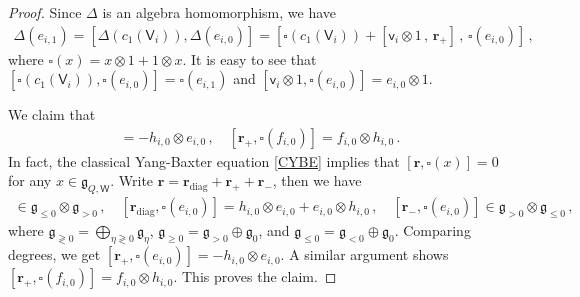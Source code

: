 \documentclass[10pt]{amsart}
\theoremstyle{definition}
\numberwithin{equation}{section}
\newcommand{\sW}{\mathsf{W}}
\begin{document}
\begin{proof}
Since $\Delta$ is an algebra homomorphism, we have
\begin{align*}
\Delta(e_{i,1})=[\Delta(c_1(\mathsf V_i)),\Delta(e_{i,0})]=\left[\square(c_1(\mathsf V_i)) +\left[\mathsf v_i\otimes 1\,,\,\pmb r_+\right]\,,\, \square(e_{i,0})\right]\,,
\end{align*}
where $\square(x)=x\otimes 1+1\otimes x$. It is easy to see that $[\square(c_1(\mathsf V_i)),\square(e_{i,0})]=\square(e_{i,1})$ and $[\mathsf v_i\otimes 1,\square(e_{i,0})]=e_{i,0}\otimes 1$. 

We claim that
\begin{align*}
[\pmb r_+,\square(e_{i,0})]=-h_{i,0}\otimes e_{i,0}\,,\quad [\pmb r_+,\square(f_{i,0})]=f_{i,0}\otimes h_{i,0}\,.
\end{align*}
In fact, the classical Yang-Baxter equation \eqref{CYBE} implies that $[\pmb r,\square(x)]=0$ for any $x\in \mathfrak{g}_{Q,\sW}$. Write $\pmb r=\pmb r_{\mathrm{diag}}+\pmb r_++\pmb r_-$, then we have
\begin{align*}
[\pmb r_+,\square(e_{i,0})]\in \mathfrak{g}_{\leqslant0}\otimes \mathfrak{g}_{>0}\,,\quad [\pmb r_{\mathrm{diag}},\square(e_{i,0})]=h_{i,0}\otimes e_{i,0}+e_{i,0}\otimes h_{i,0}\,,\quad [\pmb r_-,\square(e_{i,0})]\in \mathfrak{g}_{>0}\otimes \mathfrak{g}_{\leqslant0}\,,
\end{align*}
where $\mathfrak{g}_{\gtrless 0}=\bigoplus_{\eta \gtrless 0}\mathfrak{g}_\eta$, $\mathfrak{g}_{\geqslant 0}=\mathfrak{g}_{> 0}\oplus \mathfrak{g}_{0}$, and $\mathfrak{g}_{\leqslant 0}=\mathfrak{g}_{< 0}\oplus \mathfrak{g}_{0}$. Comparing degrees, we get $[\pmb r_+,\square(e_{i,0})]=-h_{i,0}\otimes e_{i,0}$. A similar argument shows $[\pmb r_+,\square(f_{i,0})]=f_{i,0}\otimes h_{i,0}$. This proves the claim.


\end{proof}
\end{document}
